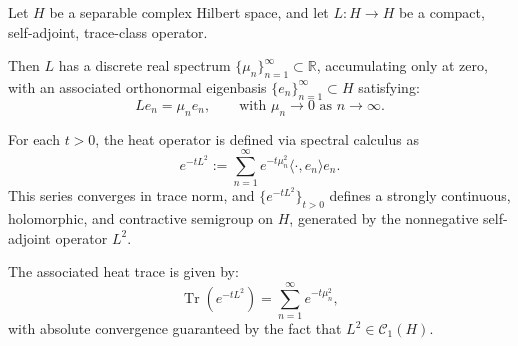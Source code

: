 \begin{definition}
\label{def:heat_operator}
Let \( H \) be a separable complex Hilbert space, and let \( L \colon H \to H \) be a compact, self-adjoint, trace-class operator.

Then \( L \) has a discrete real spectrum \( \{ \mu_n \}_{n=1}^\infty \subset \mathbb{R} \), accumulating only at zero, with an associated orthonormal eigenbasis \( \{ e_n \}_{n=1}^\infty \subset H \) satisfying:
\[
L e_n = \mu_n e_n, \qquad \text{with } \mu_n \to 0 \text{ as } n \to \infty.
\]

For each \( t > 0 \), the heat operator is defined via spectral calculus as
\[
e^{-tL^2} := \sum_{n=1}^\infty e^{-t \mu_n^2} \langle \cdot, e_n \rangle e_n.
\]
This series converges in trace norm, and \( \{ e^{-tL^2} \}_{t > 0} \) defines a strongly continuous, holomorphic, and contractive semigroup on \( H \), generated by the nonnegative self-adjoint operator \( L^2 \).

\medskip
\noindent
The associated heat trace is given by:
\[
\operatorname{Tr}(e^{-tL^2}) = \sum_{n=1}^\infty e^{-t \mu_n^2},
\]
with absolute convergence guaranteed by the fact that \( L^2 \in \mathcal{C}_1(H) \).
\end{definition}
% 